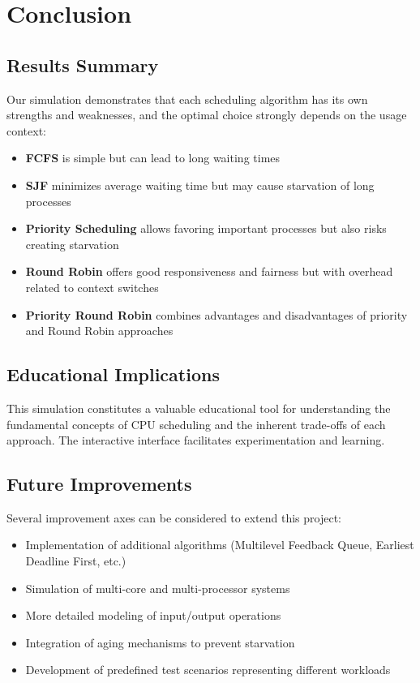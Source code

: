 \documentclass[12pt,a4paper]{article}
\begin{document}
\section{Conclusion}
\subsection{Results Summary}
Our simulation demonstrates that each scheduling algorithm has its own strengths and weaknesses, and the optimal choice strongly depends on the usage context:

\begin{itemize}
    \item \textbf{FCFS} is simple but can lead to long waiting times
    \item \textbf{SJF} minimizes average waiting time but may cause starvation of long processes
    \item \textbf{Priority Scheduling} allows favoring important processes but also risks creating starvation
    \item \textbf{Round Robin} offers good responsiveness and fairness but with overhead related to context switches
    \item \textbf{Priority Round Robin} combines advantages and disadvantages of priority and Round Robin approaches
\end{itemize}

\subsection{Educational Implications}
This simulation constitutes a valuable educational tool for understanding the fundamental concepts of CPU scheduling and the inherent trade-offs of each approach. The interactive interface facilitates experimentation and learning.

\subsection{Future Improvements}
Several improvement axes can be considered to extend this project:
\begin{itemize}
    \item Implementation of additional algorithms (Multilevel Feedback Queue, Earliest Deadline First, etc.)
    \item Simulation of multi-core and multi-processor systems
    \item More detailed modeling of input/output operations
    \item Integration of aging mechanisms to prevent starvation
    \item Development of predefined test scenarios representing different workloads
\end{itemize}
\end{document}

